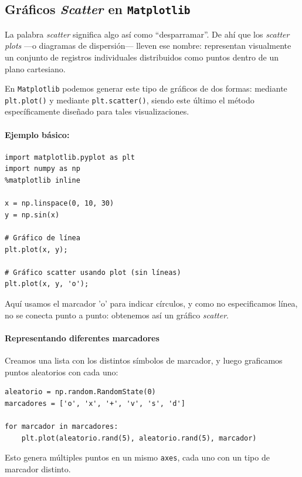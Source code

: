 \documentclass{article}
\theoremstyle{nonumberplain}
\begin{document}
\subsection*{Gráficos \textit{Scatter} en \texttt{Matplotlib}}

La palabra \textit{scatter} significa algo así como “desparramar”. De ahí que los \textit{scatter plots} —o diagramas de dispersión— lleven ese nombre: representan visualmente un conjunto de registros individuales distribuidos como puntos dentro de un plano cartesiano.

En \texttt{Matplotlib} podemos generar este tipo de gráficos de dos formas: mediante \texttt{plt.plot()} y mediante \texttt{plt.scatter()}, siendo este último el método específicamente diseñado para tales visualizaciones.

\paragraph{Ejemplo básico:}
\begin{verbatim}
import matplotlib.pyplot as plt
import numpy as np
%matplotlib inline

x = np.linspace(0, 10, 30)
y = np.sin(x)

# Gráfico de línea
plt.plot(x, y);

# Gráfico scatter usando plot (sin líneas)
plt.plot(x, y, 'o');
\end{verbatim}

Aquí usamos el marcador 'o' para indicar círculos, y como no especificamos línea, no se conecta punto a punto: obtenemos así un gráfico \textit{scatter}.

\paragraph{Representando diferentes marcadores}

Creamos una lista con los distintos símbolos de marcador, y luego graficamos puntos aleatorios con cada uno:

\begin{verbatim}
aleatorio = np.random.RandomState(0)
marcadores = ['o', 'x', '+', 'v', 's', 'd']

for marcador in marcadores:
    plt.plot(aleatorio.rand(5), aleatorio.rand(5), marcador)
\end{verbatim}

Esto genera múltiples puntos en un mismo \texttt{axes}, cada uno con un tipo de marcador distinto.
\end{document}
